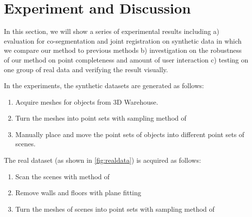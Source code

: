 \section{Experiment and Discussion}
In this section, we will show a series of experimental results including 
a) evaluation for co-segmentation and joint registration on synthetic data in which we compare our method to previous methods  b) investigation on the robustness of our method on point completeness and amount of user interaction c) testing on one group of real data and verifying the result visually.

In the experiments, the synthetic datasets are generated as follows:
\begin{enumerate}
	\item Acquire meshes for objects from 3D Warehouse.
	\item Turn the meshes into point sets with sampling method of \cite{PossionSampling}
	\item Manually place and move the point sets of objects into different point sets of scenes.   
\end{enumerate}
The real dataset (as shown in \ref{fig:realdata}) is acquired as follows:
\begin{enumerate}
	\item Scan the scenes with method of \cite{KinectFusion} 
	\item Remove walls and floors with plane fitting
	\item Turn the meshes of scenes into point sets with sampling method of \cite{PossionSampling}
\end{enumerate}

